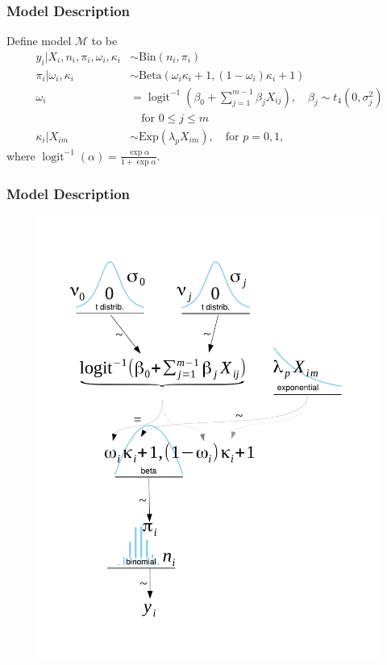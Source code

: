 \documentclass{beamer}
\DeclareMathOperator{\logit}{logit}
\begin{document}
\begin{frame}
\frametitle{Model Description}
Define model $\mathcal{M}$ to be
\begin{align*}
  y_i | X_i, n_i, \pi_i, \omega_i, \kappa_i &\sim \text{Bin}(n_i, \pi_i) \\
  \pi_i | \omega_i, \kappa_i &\sim \text{Beta}\left(\omega_i \kappa_i + 1, (1 - \omega_i) \kappa_i + 1\right) \\
  \omega_i &= \logit^{-1}\left(\beta_0 + \sum_{j=1}^{m-1}  \beta_j X_{ij}\right), \quad \beta_j \sim t_4(0, \sigma_j^2) \\&\quad \text{for $0 \leq j \leq m$}\\
  \kappa_i | X_{im} &\sim \text{Exp}(\lambda_p X_{im}), \quad \text{for $p = 0, 1$},
\end{align*}
where $\logit^{-1}(\alpha) = \frac{\exp{\alpha}}{1 + \exp{\alpha}}$.

\end{frame}

\begin{frame}
\frametitle{Model Description}
\begin{figure}[!h]
  \centering
  \includegraphics[scale=0.3]{kruschke_diagram}
\end{figure}
\end{frame}
\end{document}
